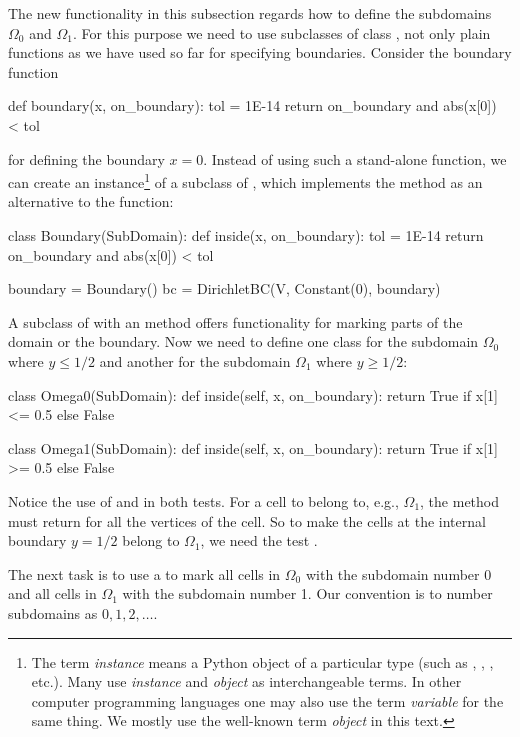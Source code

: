 The new functionality in this subsection regards how to define
the subdomains $\Omega_0$ and $\Omega_1$. For this purpose we need to
use subclasses of class ,
not only plain functions as we have used so far for specifying
boundaries. Consider the boundary function
\begin{python}
def boundary(x, on_boundary):
    tol = 1E-14
    return on_boundary and abs(x[0]) < tol
\end{python}
for defining the boundary $x=0$. Instead of using such a stand-alone
function, we can create an instance\footnote{The term \emph{instance}
means a Python object of a particular type (such as ,
, , etc.).  Many use \emph{instance}
and \emph{object} as interchangeable terms. In other computer programming
languages one may also use the term \emph{variable} for the same thing.
We mostly use the well-known term \emph{object} in this text.} of a
subclass of , which implements the  method
as an alternative to the  function:
\begin{python}
class Boundary(SubDomain):
    def inside(x, on_boundary):
        tol = 1E-14
        return on_boundary and abs(x[0]) < tol

boundary = Boundary()
bc = DirichletBC(V, Constant(0), boundary)
\end{python}

A subclass of  with an  method offers
functionality for marking parts of the domain or the boundary. Now
we need to define one class for the subdomain $\Omega_0$ where $y\leqslant
1/2$ and another for the subdomain $\Omega_1$ where $y\geqslant 1/2$:
\begin{python}
class Omega0(SubDomain):
    def inside(self, x, on_boundary):
        return True if x[1] <= 0.5 else False

class Omega1(SubDomain):
    def inside(self, x, on_boundary):
        return True if x[1] >= 0.5 else False
\end{python}
Notice the use of \emp{<=} and \emp{>=} in both tests. For a cell
to belong to, e.g., $\Omega_1$, the  method must return
 for all the vertices  of the cell. So to make the cells
at the internal boundary $y=1/2$ belong to $\Omega_1$, we need the test
.

The next task is to use a  to mark all cells in
$\Omega_0$ with the subdomain number 0 and all cells in $\Omega_1$
with the subdomain number 1.  Our convention is to number subdomains
as $0,1,2,\ldots$.

